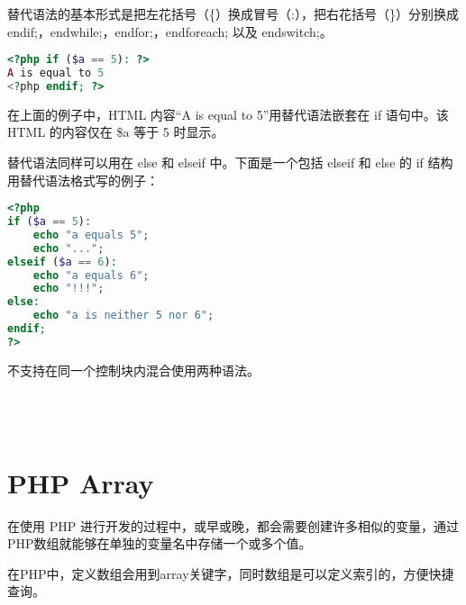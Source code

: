 替代语法的基本形式是把左花括号（\{）换成冒号（:），把右花括号（\}）分别换成 endif;，endwhile;，endfor;，endforeach; 以及 endswitch;。

\begin{lstlisting}[language=PHP]
<?php if ($a == 5): ?>
A is equal to 5
<?php endif; ?>
\end{lstlisting}


在上面的例子中，HTML 内容“A is equal to 5”用替代语法嵌套在 if 语句中。该 HTML 的内容仅在 \$a 等于 5 时显示。

替代语法同样可以用在 else 和 elseif 中。下面是一个包括 elseif 和 else 的 if 结构用替代语法格式写的例子：


\begin{lstlisting}[language=PHP]
<?php
if ($a == 5):
    echo "a equals 5";
    echo "...";
elseif ($a == 6):
    echo "a equals 6";
    echo "!!!";
else:
    echo "a is neither 5 nor 6";
endif;
?>
\end{lstlisting}

不支持在同一个控制块内混合使用两种语法。




\begin{lstlisting}[language=PHP]

\end{lstlisting}




\begin{lstlisting}[language=PHP]

\end{lstlisting}




\begin{lstlisting}[language=PHP]

\end{lstlisting}




\begin{lstlisting}[language=PHP]

\end{lstlisting}

\chapter{PHP Array}



在使用 PHP 进行开发的过程中，或早或晚，都会需要创建许多相似的变量，通过PHP数组就能够在单独的变量名中存储一个或多个值。

在PHP中，定义数组会用到array关键字，同时数组是可以定义索引的，方便快捷查询。

